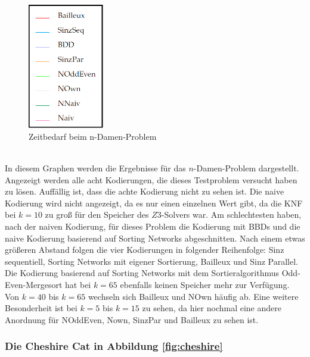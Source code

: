 \documentclass[a4,abstract=on]{scrartcl}
\begin{document}
\begin{figure}[htbp]
\includegraphics[width=3.3cm]{Legende.png}
\caption{Zeitbedarf beim n-Damen-Problem}
\label{fig:damen}
\end{figure}
\ \\
In diesem Graphen werden die Ergebnisse für das $n$-Damen-Problem dargestellt. Angezeigt werden alle acht Kodierungen, die dieses Testproblem versucht haben zu lösen. Auffällig ist, dass die achte Kodierung nicht zu sehen ist. Die naive Kodierung wird nicht angezeigt, da es nur einen einzelnen Wert gibt, da die KNF bei $k=10$ zu groß für den Speicher des $Z3$-Solvers war. Am schlechtesten haben, nach der naiven Kodierung, für dieses Problem die Kodierung mit BBDs und die naive Kodierung basierend auf Sorting Networks abgeschnitten. Nach einem etwas größeren Abstand folgen die vier Kodierungen in folgender Reihenfolge: Sinz sequentiell, Sorting Networks mit eigener Sortierung, Bailleux und Sinz Parallel. Die Kodierung basierend auf Sorting Networks mit dem Sortieralgorithmus Odd-Even-Mergesort hat bei $k=65$ ebenfalls keinen Speicher mehr zur Verfügung. Von $k=40$ bis $k=65$ wechseln sich Bailleux und NOwn häufig ab. Eine weitere Besonderheit ist bei $k=5$ bis $k=15$ zu sehen, da hier nochmal eine andere Anordnung für NOddEven, Nown, SinzPar und Bailleux zu sehen ist. 

\subsubsection*{Die Cheshire Cat in Abbildung \ref{fig:cheshire}}
\end{document}
